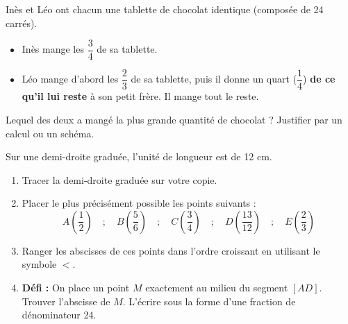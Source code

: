 \documentclass[a4paper]{book}
\begin{document}
    \vspace{0.5cm}
    
    \begin{exercice}
        Inès et Léo ont chacun une tablette de chocolat identique (composée de 24 carrés).
        \begin{itemize}
            \item Inès mange les $\dfrac{3}{4}$ de sa tablette.
            \item Léo mange d'abord les $\dfrac{2}{3}$ de sa tablette, puis il donne un quart ($\dfrac{1}{4}$) \textbf{de ce qu'il lui reste} à son petit frère. Il mange tout le reste.
        \end{itemize}
        Lequel des deux a mangé la plus grande quantité de chocolat ? Justifier par un calcul ou un schéma.
    \end{exercice}

    \vspace{0.5cm}
    
    \begin{exercice}
        Sur une demi-droite graduée, l'unité de longueur est de 12 cm. 
        
        \begin{enumerate}
            \item Tracer la demi-droite graduée sur votre copie.
            \item Placer le plus précisément possible les points suivants : 
            \[ A\left(\dfrac{1}{2}\right) \quad ; \quad B\left(\dfrac{5}{6}\right) \quad ; \quad C\left(\dfrac{3}{4}\right) \quad ; \quad D\left(\dfrac{13}{12}\right) \quad ; \quad E\left(\dfrac{2}{3}\right) \]
            \item Ranger les abscisses de ces points dans l'ordre croissant en utilisant le symbole $<$.
            \item \textbf{Défi :} On place un point $M$ exactement au milieu du segment $[AD]$. Trouver l'abscisse de $M$. L'écrire sous la forme d'une fraction de dénominateur 24.
        \end{enumerate}
    \end{exercice}
\end{document}
